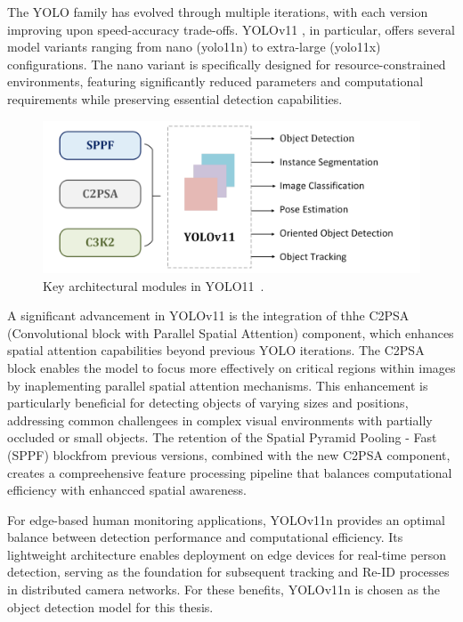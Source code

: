 \documentclass[../main.tex]{subfiles}
\begin{document}
The YOLO family has evolved through multiple iterations, with each version improving upon speed-accuracy trade-offs. YOLOv11 \cite{khanam2024yolov11overviewkeyarchitectural}, in particular, offers several model variants ranging from nano (yolo11n) to extra-large (yolo11x)\\configurations. The nano variant is specifically designed for resource-constrained environments, featuring significantly reduced parameters and computational requirements while preserving essential detection capabilities.

\begin{figure}[h!]
\centering
\includegraphics[width=\linewidth]{Figure/yolov11.png}
\caption{ Key architectural modules in YOLO11~\cite{khanam2024yolov11overviewkeyarchitectural}.}
\label{fig:yolov11}
\end{figure}

A significant advancement in YOLOv11 is the integration of thhe C2PSA \\(Convolutional
block with Parallel Spatial Attention) component, which enhances spatial attention capabilities beyond previous YOLO iterations. The C2PSA block enables the model to focus more effectively on critical regions within images by inaplementing parallel spatial
attention mechanisms. This enhancement is particularly beneficial for detecting objects of varying sizes and positions, addressing common challengees in complex visual environments with partially occluded or small objects. The retention of the Spatial Pyramid Pooling - Fast (SPPF) blockfrom previous versions, combined with the new C2PSA component, creates a compreehensive feature processing pipeline that balances computational efficiency with enhancced spatial awareness.

For edge-based human monitoring applications, YOLOv11n provides an optimal balance between detection performance and computational efficiency. Its lightweight architecture enables deployment on edge devices for real-time person detection, serving as the foundation for subsequent tracking and Re-ID processes in distributed camera networks. For these benefits, YOLOv11n is chosen as the object detection model for this thesis.
\end{document}
